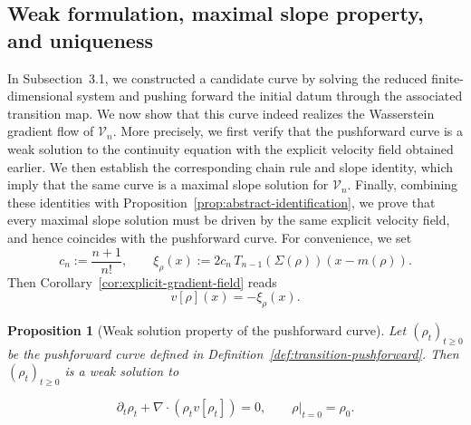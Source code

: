 \documentclass[11pt,reqno]{amsart}
\numberwithin{figure}{section}
\newtheorem{proposition}{Proposition}[section]
\begin{document}
\subsection{Weak formulation, maximal slope property, and uniqueness} In Subsection~3.1, we constructed a candidate curve by solving the reduced finite-dimensional system and pushing forward the initial datum through the associated transition map. We now show that this curve indeed realizes the Wasserstein gradient flow of $\mathcal V_n$. More precisely, we first verify that the pushforward curve is a weak solution to the continuity equation with the explicit velocity field obtained earlier. We then establish the corresponding chain rule and slope identity, which imply that the same curve is a maximal slope solution for $\mathcal V_n$. Finally, combining these identities with Proposition~\ref{prop:abstract-identification}, we prove that every maximal slope solution must be driven by the same explicit velocity field, and hence coincides with the pushforward curve. For convenience, we set \[ c_n:=\frac{n+1}{n!}, \qquad \xi_\rho(x):=2c_n\,T_{n-1}(\Sigma(\rho))(x-m(\rho)). \] Then Corollary~\ref{cor:explicit-gradient-field} reads \[ v[\rho](x)=-\xi_\rho(x). \] 

\begin{proposition}[Weak solution property of the pushforward curve] \label{prop:pushforward-weak-solution} Let $(\rho_t)_{t\ge0}$ be the pushforward curve defined in Definition~\ref{def:transition-pushforward}. Then $(\rho_t)_{t\ge0}$ is a weak solution to 

\[ \partial_t\rho_t+\nabla\cdot(\rho_t v[\rho_t])=0, \qquad \rho|_{t=0}=\rho_0. \] \end{proposition} 
\end{document}
